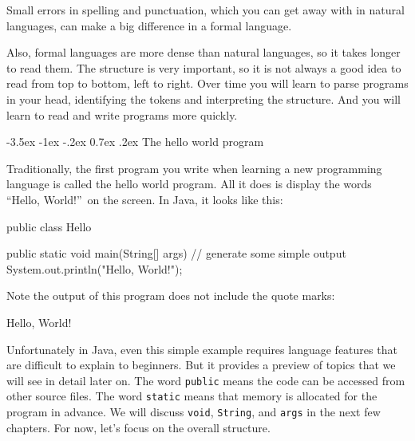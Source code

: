 \documentclass[12pt]{book}
\makeatletter
\theoremstyle{exercise}
\newcommand{\java}[1]{\verb"#1"}
\renewcommand{\section}{\@startsection {section}{1}{\z@}%
    {-3.5ex \@plus -1ex \@minus -.2ex}%
    {0.7ex \@plus.2ex}%
    {\normalfont\Large\bfseries}}
\newcommand{\java}[1]{\lstinline{#1}} %
\makeatother
\begin{document}

Small errors in spelling and punctuation, which you can get away with in natural languages, can make a big difference in a formal language.

Also, formal languages are more dense than natural languages, so it takes longer to read them.
The structure is very important, so it is not always a good idea to read from top to bottom, left to right.
Over time you will learn to parse programs in your head, identifying the tokens and interpreting the structure.
And you will learn to read and write programs more quickly.



\section{The hello world program}
\label{sec:hello}


Traditionally, the first program you write when learning a new programming language is called the hello world program.
All it does is display the words ``Hello, World!''\ on the screen.
In Java, it looks like this:

\begin{code}
public class Hello {

    public static void main(String[] args) {
        // generate some simple output
        System.out.println("Hello, World!");
    }

}
\end{code}

Note the output of this program does not include the quote marks:

\begin{stdout}
Hello, World!
\end{stdout}


Unfortunately in Java, even this simple example requires language features that are difficult to explain to beginners.
But it provides a preview of topics that we will see in detail later on.
The word \java{public} means the code can be accessed from other source files.
The word \java{static} means that memory is allocated for the program in advance.
We will discuss \java{void}, \java{String}, and \java{args} in the next few chapters.
For now, let's focus on the overall structure.

\end{document}
